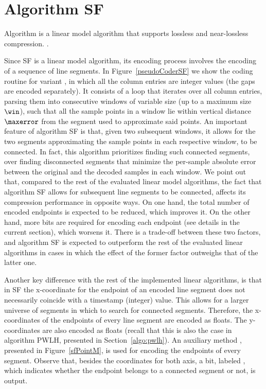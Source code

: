 

\section{Algorithm SF}
\label{algo:sf}


Algorithm \textit{\SFfull} \cite{coder:sf} is a linear model algorithm that supports lossless and near-lossless compression. \WindowParam {}.


Since SF is a linear model algorithm, its encoding process involves the encoding of a sequence of line segments. In Figure~\ref{pseudoCoderSF} we show the coding routine for variant \maskalgo, in which all the column entries are integer values (the gaps are encoded separately). It consists of a loop that iterates over all column entries, parsing them into consecutive windows of variable size (up to a maximum size~$\win$), such that all the sample points in a window lie within vertical distance $\maxerror$ from the segment used to approximate said points. An important feature of algorithm SF is that, given two subsequent windows, it allows for the two segments approximating the sample points in each respective window, to be connected. In fact, this algorithm prioritizes finding such connected segments, over finding disconnected segments that minimize the per-sample absolute error between the original and the decoded samples in each window. We point out that, compared to the rest of the evaluated linear model algorithms, the fact that algorithm SF allows for subsequent line segments to be connected, affects its compression performance in opposite ways. On one hand, the total number of encoded endpoints is expected to be reduced, which improves it. On the other hand, more bits are required for encoding each endpoint (see details in the current section), which worsens it. There is a trade-off between these two factors, and algorithm SF is expected to outperform the rest of the evaluated linear algorithms in cases in which the effect of the former factor outweighs that of the latter one.





\clearpage


Another key difference with the rest of the implemented linear algorithms, is that in SF the x-coordinate for the endpoint of an encoded line segment does not necessarily coincide with a timestamp (integer) value. This allows for a larger universe of segments in which to search for connected segments. Therefore, the x-coordinates of the endpoints of every line segment are encoded as floats. The y-coordinates are also encoded as floats (recall that this is also the case in algorithm PWLH, presented in Section~\ref{algo:pwlh}). An auxiliary method \SFEncodePoint, presented in Figure~\ref{sfPointM}, is used for encoding the endpoints of every segment. Observe that, besides the coordinates for both axis, a bit, labeled \connectedS, which indicates whether the endpoint belongs to a connected segment or not, is output.


